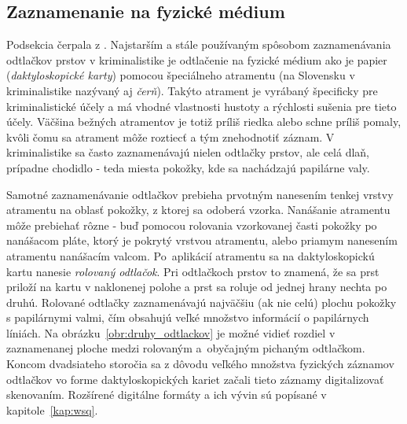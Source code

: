   \subsection{Zaznamenanie na fyzické médium}
  Podsekcia čerpala z \cite{FingerprintSrcBook}.
  Najstarším a stále používaným spôsobom zaznamenávania odtlačkov prstov v kriminalistike je odtlačenie na fyzické médium ako je papier
  (\emph{daktyloskopické karty})
  pomocou špeciálneho atramentu (na Slovensku v kriminalistike nazývaný aj \emph{čerň}). Takýto atrament je vyrábaný špecificky pre kriminalistické účely a má
  vhodné vlastnosti hustoty a rýchlosti sušenia pre tieto
  účely. Väčšina bežných atramentov je totiž príliš riedka alebo schne príliš pomaly, kvôli čomu sa atrament môže roztiecť a tým znehodnotiť záznam.
  V kriminalistike sa často zaznamenávajú nielen odtlačky prstov, ale celá dlaň, prípadne chodidlo - teda miesta pokožky, kde sa nachádzajú papilárne valy.

  Samotné zaznamenávanie odtlačkov prebieha prvotným nanesením tenkej vrstvy atramentu na oblasť pokožky, z ktorej sa odoberá vzorka. Nanášanie atramentu môže
  prebiehať rôzne - buď pomocou rolovania vzorkovanej časti pokožky po nanášacom pláte, ktorý je pokrytý vrstvou atramentu, alebo priamym nanesením atramentu
  nanášacím valcom. Po~aplikácií atramentu sa na daktyloskopickú kartu nanesie \emph{rolovaný odtlačok}. Pri odtlačkoch prstov to znamená, že sa prst priloží
  na kartu v naklonenej polohe a prst sa roluje od jednej hrany nechta po druhú. Rolované odtlačky zaznamenávajú najväčšiu (ak nie celú) plochu pokožky
  s papilárnymi valmi, čím obsahujú veľké množstvo informácií o papilárnych líniách. Na obrázku~{\ref{obr:druhy_odtlackov}} je možné vidieť rozdiel v zaznamenanej
  ploche medzi rolovaným a~obyčajným pichaným odtlačkom. Koncom dvadsiateho storočia sa z dôvodu veľkého množstva fyzických záznamov odtlačkov vo forme
  daktyloskopických kariet začali tieto záznamy digitalizovať skenovaním. Rozšírené digitálne formáty a ich vývin sú popísané v kapitole~{\ref{kap:wsq}}.

